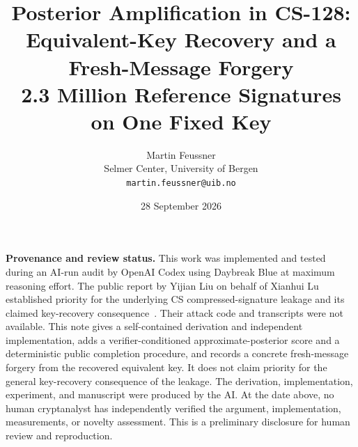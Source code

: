 \documentclass[11pt]{article}
\title{\bfseries Posterior Amplification in CS-128:\\
Equivalent-Key Recovery and a Fresh-Message Forgery\\[0.35em]
\large 2.3 Million Reference Signatures on One Fixed Key}
\author{Martin Feussner\\
Selmer Center, University of Bergen\\
\texttt{martin.feussner@uib.no}}
\date{28 September 2026}
\begin{document}
\maketitle

\noindent\textbf{Provenance and review status.}
This work was implemented and tested during an AI-run audit by OpenAI Codex using
Daybreak Blue at maximum reasoning effort.  The public report by Yijian Liu on behalf of
Xianhui Lu established priority for the underlying CS compressed-signature leakage and its
claimed key-recovery consequence~\cite{liu-lu,ngcc-report}.  Their attack code and transcripts
were not available.  This note gives a self-contained derivation and independent
implementation, adds a verifier-conditioned approximate-posterior score and a deterministic
public completion procedure, and records a concrete fresh-message forgery from the recovered
equivalent key.  It does not claim priority for the general key-recovery consequence of the
leakage.  The derivation, implementation, experiment, and manuscript were produced by the
AI.  At the date above, no human cryptanalyst has independently verified the argument,
implementation, measurements, or novelty assessment.  This is a preliminary disclosure for
human review and reproduction.
\end{document}
